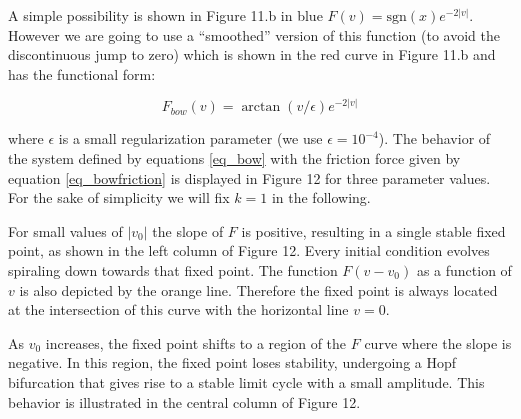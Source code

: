 \documentclass{article}
\begin{document}
A simple possibility is shown in Figure 11.b in blue $F(v) = \text{sgn}(x) e^{-2|v|}$. 
However we are going to use a “smoothed” version of this function (to avoid the discontinuous jump to zero) which is shown in the red curve in Figure 11.b and has the functional form:

\begin{equation} \label{eq_bowfriction}
    F_{bow}(v) = \arctan(v/\epsilon) e^{-2|v|} 
\end{equation}

where $\epsilon$ is a small regularization parameter (we use $\epsilon = 10^{-4}$).
The behavior of the system defined by equations \ref{eq_bow} with the friction force given by equation \ref{eq_bowfriction} is displayed in Figure 12 for three parameter values. 
For the sake of simplicity we will fix $k=1$ in the following.

For small values of $|v_0|$ the slope of $F$ is positive, resulting in a single stable fixed point, as shown in the left column of Figure 12.
Every initial condition evolves spiraling down towards that fixed point. 
The function $F(v-v_0)$ as a function of $v$ is also depicted by the 
orange line. Therefore the fixed point is always located at the intersection of this curve with the horizontal line $v=0$.

\begin{figure}[h]
    \centering
    \caption{} 
    \label{fig_bow}
\end{figure}

As $v_0$ increases, the fixed point shifts to a region of the  $F$ curve where the slope is negative. In this region, the fixed point loses stability, undergoing a Hopf bifurcation that gives rise to a stable limit cycle with a small amplitude. 
This behavior is illustrated in the central column of Figure 12.
\end{document}
